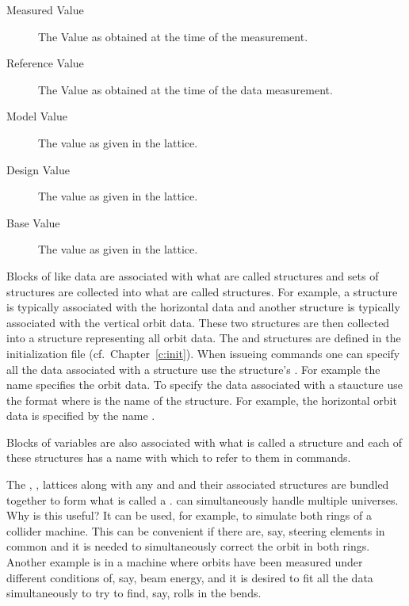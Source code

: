 \begin{description}
\begin{description}
\item[Measured Value] 
The Value as obtained at the time of the  measurement.
\item[Reference Value] 
The Value as obtained at the time of the  data  measurement.
\item[Model Value]
The value as given in the  lattice.
\item[Design Value]
The value as given in the  lattice.
\item[Base Value]
The value as given in the  lattice.
\end{description}
\end{description}

Blocks of like data are associated with what are called 
structures and sets of  structures are collected into what
are called  structures. For example, a 
structure is typically associated with the horizontal data and another
 structure is typically associated with the vertical orbit
data. These two structures are then collected into a 
structure representing all orbit data. The  and
 structures are defined in the \tao initialization file
(cf.~Chapter~\ref{c:init}).  When issueing \tao commands one can
specify all the data associated with a  structure use the
structure's .  For example the name  specifies the
orbit data. To specify the data associated with a 
staucture use the format  where  is the
 name of the  structure. For example, the horizontal
orbit data is specified by the name .

Blocks of variables are also associated with what is called a
 structure and each of these structures has a 
name with which to refer to them in \tao commands.

The , ,  lattices along with any
 and  and their associated structures are
bundled together to form what is called a . \tao can
simultaneously handle multiple universes. Why is this useful? It can
be used, for example, to simulate both rings of a collider
machine. This can be convenient if there are, say, steering elements
in common and it is needed to simultaneously correct the orbit in both
rings. Another example is in a machine where orbits have been measured
under different conditions of, say, beam energy, and it is desired to
fit all the data simultaneously to try to find, say, rolls in the
bends.

